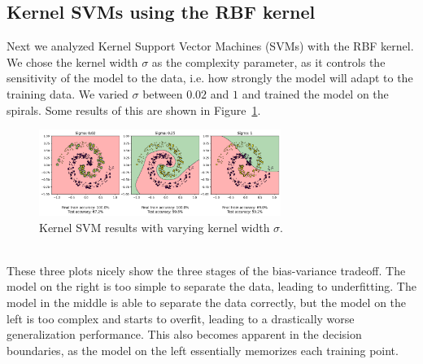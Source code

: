 \documentclass[11pt]{article}
\begin{document}
\subsection{Kernel SVMs using the RBF kernel}
Next we analyzed Kernel Support Vector Machines (SVMs) with the RBF kernel. We chose the kernel width $\sigma$ as the complexity parameter, as it controls the sensitivity of the model to the data, i.e. how strongly the model will adapt to the training data. We varied $\sigma$ between $0.02$ and $1$ and trained the model on the spirals. Some results of this are shown in Figure~\ref{fig:kernel_svm_results}.\begin{figure}[h]
    \centering
    \includegraphics[width=0.7\textwidth]{img/ksvm-result.png}
    \caption{Kernel SVM results with varying kernel width $\sigma$.}
    \label{fig:kernel_svm_results}
\end{figure}\\
These three plots nicely show the three stages of the bias-variance tradeoff. The model on the right is too simple to separate the data, leading to underfitting. The model in the middle is able to separate the data correctly, but the model on the left is too complex and starts to overfit, leading to a drastically worse generalization performance. This also becomes apparent in the decision boundaries, as the model on the left essentially memorizes each training point.
\end{document}
